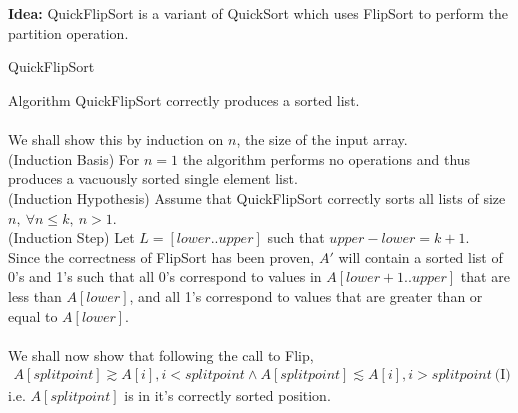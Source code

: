 \documentclass[12pt]{article}
\newenvironment{lemma}[2][Lemma]{\begin{trivlist}
\item[\hskip \labelsep {\bfseries #1}\hskip \labelsep {\bfseries #2.}]}{\end{trivlist}}
\newenvironment{question}[2][Question]{\begin{trivlist}
\item[\hskip \labelsep {\bfseries #1}\hskip \labelsep {\bfseries #2.}]}{\end{trivlist}}
\begin{document}
\begin{question}{1 (b)}
  \leavevmode \\ \\
  \textbf{Idea:} QuickFlipSort is a variant of QuickSort which uses FlipSort
  to perform the partition operation.\\
  \begin{algorithm}[H]
    \caption{QuickFlipSort}
    \BlankLine

  \end{algorithm}

  \begin{lemma}{1.5} Algorithm QuickFlipSort correctly produces a sorted list. \\ \\
    We shall show this by induction on $n$, the size of the input array. \\
    (Induction Basis) For $n=1$ the algorithm performs no operations and thus
    produces a vacuously sorted single element list.\\
    (Induction Hypothesis) Assume that QuickFlipSort correctly sorts all lists
    of size \\$n,\ \forall n \leq k,\ n > 1$. \\
    (Induction Step) Let $L = [lower..upper]$ such that $upper - lower = k + 1$.\\
    Since the correctness of FlipSort has been proven, $A'$ will contain a sorted
    list of 0's and 1's such that all 0's correspond to values in $A[lower+1..upper]$
    that are less than $A[lower]$, and all 1's correspond to values that are
    greater than or equal to $A[lower]$.\\ \\
    We shall now show that following the call to Flip,
    \begin{align*}
      A[splitpoint] \gtrsim A[i], i < splitpoint \land A[splitpoint] \lesssim A[i], i > splitpoint\ \text{(I)}
    \end{align*}
    i.e. $A[splitpoint]$ is in it's correctly sorted position.\\


\end{lemma}
\end{question}
\end{document}
